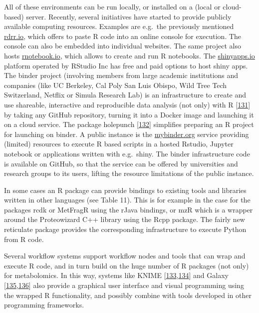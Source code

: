 \documentclass[]{article}
\begin{document}
All of these environments can be run locally, or installed on a (local or cloud-based) server. Recently, several initiatives have started to provide publicly available computing resources. Examples are e.g.~the previously mentioned \href{https://rdrr.io/}{rdrr.io}, which offers to paste R code into an online console for execution. The console can also be embedded into individual websites. The same project also hosts \href{https://rnotebook.io/}{rnotebook.io}, which allows to create and run R notebooks. The \href{https://shinyapps.io/}{shinyapps.io} platform operated by RStudio Inc has free and paid options to host shiny apps. The binder project (involving members from large academic institutions and companies (like UC Berkeley, Cal Poly San Luis Obispo, Wild Tree Tech Switzerland, Netflix or Simula Research Lab) is an infrastructure to create and use shareable, interactive and reproducible data analysis (not only) with R {[}\protect\hyperlink{ref-jupyter_2018}{131}{]} by taking any GitHub repository, turning it into a Docker image and launching it on a cloud service. The package holepunch {[}\protect\hyperlink{ref-ram_website_nd}{132}{]} simplifies preparing an R project for launching on binder. A public instance is the \href{https://mybinder.org/}{mybinder.org} service providing (limited) resources to execute R based scripts in a hosted Rstudio, Jupyter notebook or applications written with e.g.~shiny. The binder infrastructure code is available on GitHub, so that the service can be offered by universities and research groups to its users, lifting the resource limitations of the public instance.

In some cases an R package can provide bindings to existing tools and libraries written in other languages (see Table 11). This is for example in the case for the packages rcdk or MetFragR using the rJava bindings, or mzR which is a wrapper around the Proteowizard C++ library using the Rcpp package. The fairly new reticulate package provides the corresponding infrastructure to execute Python from R code.

Several workflow systems support workflow nodes and tools that can wrap and execute R code, and in turn build on the huge number of R packages (not only) for metabolomics. In this way, systems like KNIME {[}\protect\hyperlink{ref-liggi_2018}{133},\protect\hyperlink{ref-verhoeven_2018}{134}{]} and Galaxy {[}\protect\hyperlink{ref-davidson_2016}{135},\protect\hyperlink{ref-giacomoni_2015}{136}{]} also provide a graphical user interface and visual programming using the wrapped R functionality, and possibly combine with tools developed in other programming frameworks.
\end{document}
